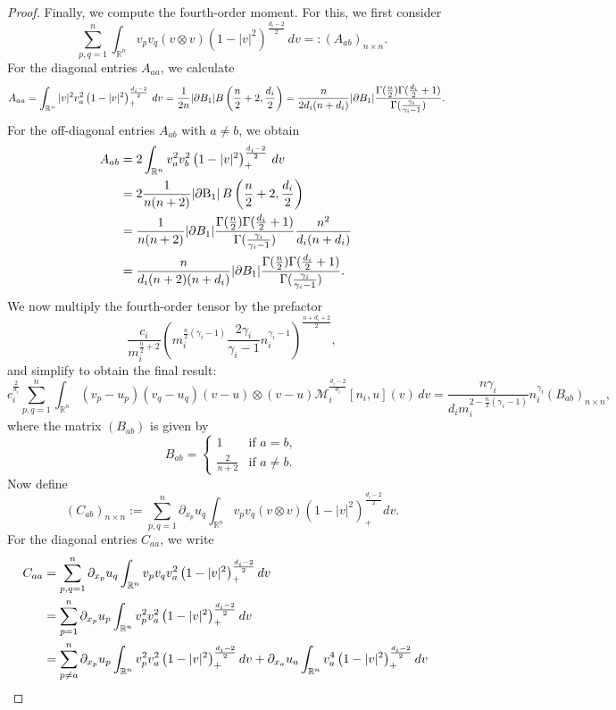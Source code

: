 \documentclass[10pt,a4paper]{amsart}
\newcommand{\R}{\mathbb R}
\newcommand{\intr}{\int_{\R^n}}
\newcommand{\pa}{\partial}
\begin{document}
\begin{proof}
 Finally, we compute the fourth-order moment. For this, we first consider
\[
\sum_{p,q=1}^n \int_{\mathbb{R}^n} v_p v_q (v \otimes v) (1 - |v|^2)^{\frac{d_i - 2}{2}}\, dv =: (A_{ab})_{n \times n}.
\]
For the diagonal entries $A_{aa}$, we calculate
\begin{align*}
A_{aa}&=\intr |v|^2 v_a^2   \left(1-|v|^2\right)^{\frac{d_i-2}{2}}_+\,dv   =\frac {1}{2n}|\pa {\rm B}_1|B\left(\frac{n}{2}+2,\frac {d_i}2 \right) =\frac{n}{2d_i(n+d_i)}|\pa {\rm B}_1|\frac{\Gamma(\frac n2)\Gamma(\frac {d_i}{2}+1)}{\Gamma(\frac{\gamma_i}{\gamma_i-1})}.
\end{align*}
For the off-diagonal entries $A_{ab}$ with $a \ne b$, we obtain
\begin{align}\label{ab}\begin{split}
A_{ab}&=2\intr v_a^2 v_b^2   \left(1-|v|^2\right)^{\frac{d_i-2}{2}}_+\,dv\cr 
&=2  \frac{1}{n(n+2)} |\partial \mathrm{B}_1| \, B\left(\frac{n}{2}+2, \frac{d_i}2 \right)\cr 
&=\frac{1}{n(n+2)}|\pa {\rm B}_1|\frac{\Gamma(\frac n2)\Gamma(\frac {d_i}{2}+1)}{\Gamma(\frac{\gamma_i}{\gamma_i-1})}\frac{n^2}{d_i(n+d_i)}\cr 
&=\frac{n}{d_i(n+2)(n+d_i)}|\pa {\rm B}_1|\frac{\Gamma(\frac n2)\Gamma(\frac {d_i}{2}+1)}{\Gamma(\frac{\gamma_i}{\gamma_i-1})}.
\end{split}\end{align}
We now multiply the fourth-order tensor by the prefactor
\[
\frac{c_i}{m_i^{\frac{n}{2} + 2}} \left( m_i^{\frac{n}{2}(\gamma_i - 1)} \frac{2\gamma_i}{\gamma_i - 1} n_i^{\gamma_i - 1} \right)^{\frac{n + d_i + 2}{2}},
\]
and simplify to obtain the final result:
\[
c_i^{\frac{2}{d_i}} \sum_{p,q=1}^n \int_{\mathbb{R}^n} (v_p - u_p)(v_q - u_q)(v - u) \otimes (v - u) \mathcal{M}_i^{\frac{d_i - 2}{d_i}}[n_i, u](v)\, dv = \frac{n \gamma_i}{d_i m_i^{2 - \frac{n}{2}(\gamma_i - 1)}} n_i^{\gamma_i} (B_{ab})_{n \times n},
\]
where the matrix $(B_{ab})$ is given by
\[
B_{ab} = \begin{cases}
1 & \text{if } a = b, \\
\frac{2}{n + 2} & \text{if } a \ne b.
\end{cases}
\]
Now define
$$
(C_{ab})_{n \times n}:=\sum_{p,q=1}^n\pa_{x_p}u_q\intr v_p v_q (v\otimes v) \left(1-|v |^2\right)^{\frac{d_i-2}{2}}_+  dv.
$$
For the diagonal entries $C_{aa}$, we write
\begin{align*}
C_{aa}&=\sum_{p,q=1}^n\pa_{x_p}u_q\intr v_p v_q v_a^2 \left(1-|v |^2\right)^{\frac{d_i-2}{2}}_+  dv\cr 
&=\sum_{p=1}^n\pa_{x_p}u_p\intr v_p^2 v_a^2 \left(1-|v |^2\right)^{\frac{d_i-2}{2}}_+  dv\cr 
&=\sum_{p\neq a}^n\pa_{x_p}u_p\intr v_p^2 v_a^2 \left(1-|v |^2\right)^{\frac{d_i-2}{2}}_+  dv+\pa_{x_a}u_a\intr  v_a^4 \left(1-|v |^2\right)^{\frac{d_i-2}{2}}_+  dv\cr 

\end{align*}
\end{proof}
\end{document}
